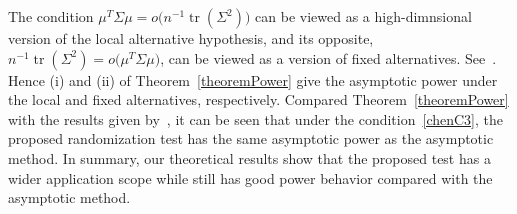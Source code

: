 \documentclass[3p]{elsarticle}
\DeclareMathOperator{\mytr}{tr}
\theoremstyle{plain}
\theoremstyle{definition}
\newtheorem{remark}{\quad\quad Remark}
\theoremstyle{remark}
\begin{document}






The condition $\mu^T \Sigma \mu= o\big(n^{-1}\mytr(\Sigma^2)\big)$ can be viewed as a high-dimnsional version of the local alternative hypothesis, and its opposite, $n^{-1}\mytr(\Sigma^2)= o\big(\mu^T \Sigma \mu\big)$, can be viewed as a version of fixed alternatives. See~\cite{Chen2010A}.
Hence (i) and (ii) of Theorem~\ref{theoremPower} give the asymptotic power under the local and fixed alternatives, respectively.
Compared Theorem~\ref{theoremPower} with the results given by~\cite{Chen2010A}, it can be seen that under the condition~\eqref{chenC3}, the proposed randomization test has the same asymptotic power as the asymptotic method.
In summary, our theoretical results show that the proposed test has a wider application scope while still has good power behavior compared with the asymptotic method.
\end{document}
